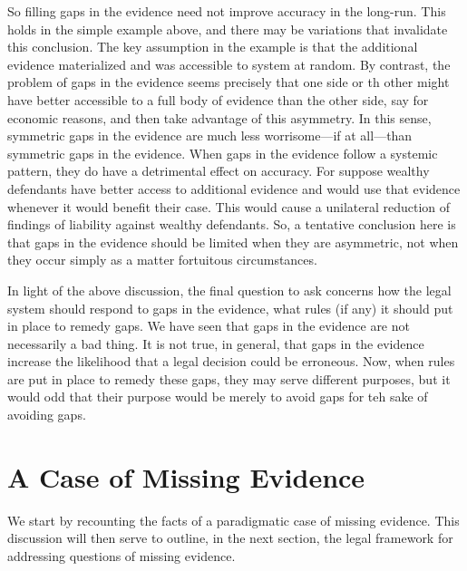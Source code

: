 \documentclass[
  10pt,
  dvipsnames,enabledeprecatedfontcommands]{scrartcl}
\begin{document}
So filling gaps in the evidence need not improve accuracy in the
long-run. This holds in the simple example above, and there may be
variations that invalidate this conclusion. The key assumption in the
example is that the additional evidence materialized and was accessible
to system at random. By contrast, the problem of gaps in the evidence
seems precisely that one side or th other might have better accessible
to a full body of evidence than the other side, say for economic
reasons, and then take advantage of this asymmetry. In this sense,
symmetric gaps in the evidence are much less worrisome---if at
all---than symmetric gaps in the evidence. When gaps in the evidence
follow a systemic pattern, they do have a detrimental effect on
accuracy. For suppose wealthy defendants have better access to
additional evidence and would use that evidence whenever it would
benefit their case. This would cause a unilateral reduction of findings
of liability against wealthy defendants. So, a tentative conclusion here
is that gaps in the evidence should be limited when they are asymmetric,
not when they occur simply as a matter fortuitous circumstances.

In light of the above discussion, the final question to ask concerns how
the legal system should respond to gaps in the evidence, what rules (if
any) it should put in place to remedy gaps. We have seen that gaps in
the evidence are not necessarily a bad thing. It is not true, in
general, that gaps in the evidence increase the likelihood that a legal
decision could be erroneous. Now, when rules are put in place to remedy
these gaps, they may serve different purposes, but it would odd that
their purpose would be merely to avoid gaps for teh sake of avoiding
gaps.

\hypertarget{a-case-of-missing-evidence}{%
\section{A Case of Missing Evidence}\label{a-case-of-missing-evidence}}

We start by recounting the facts of a paradigmatic case of missing
evidence. This discussion will then serve to outline, in the next
section, the legal framework for addressing questions of missing
evidence.
\end{document}

